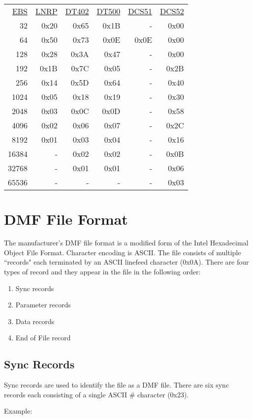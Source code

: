 \begin{tabular}{r r r r r r}
\underline{EBS} & \underline{LNRP} & \underline{DT402} & \underline{DT500} & \underline{DCS51}& \underline{DCS52}\\
32 & 0x20 & 0x65 & 0x1B & - & 0x00 \\
64 & 0x50 & 0x73 & 0x0E & 0x0E & 0x00\\
128 & 0x28 & 0x3A & 0x47 & - & 0x00\\
192 & 0x1B & 0x7C & 0x05& - & 0x2B\\
256 & 0x14 & 0x5D & 0x64& - & 0x40\\
1024 & 0x05 & 0x18 & 0x19& - & 0x30\\
2048 & 0x03 & 0x0C & 0x0D& - & 0x58\\
4096 & 0x02 & 0x06 & 0x07& - & 0x2C\\
8192 & 0x01 & 0x03 & 0x04& - & 0x16\\
16384 & - & 0x02 & 0x02& - & 0x0B\\
32768 & - & 0x01 & 0x01& - & 0x06\\
65536 & - & - & - & - & 0x03\\
\end{tabular}

\section{DMF File Format}
 
The manufacturer's DMF file format is a modified form of the Intel Hexadecimal Object File Format. Character encoding is ASCII. The file consists of multiple ``records" each terminated by an ASCII linefeed character (0x0A). There are four types of record and they appear in the file in the following order:

\begin{enumerate}
\item Sync records
\item Parameter records
\item Data records
\item End of File record
\end{enumerate}

\subsection{Sync Records}
Sync records are used to identify the file as a DMF file. There are six sync records each consisting of a single ASCII \# character (0x23).

Example:

